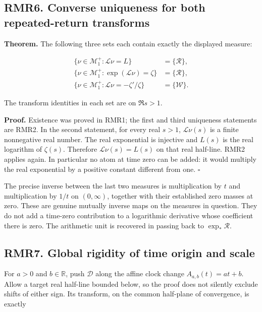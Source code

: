 \subsection{RMR6. Converse uniqueness for both repeated-return
transforms}\label{rmr6.-converse-uniqueness-for-both-repeated-return-transforms}

\textbf{Theorem.} The following three sets each contain exactly the
displayed measure:

\[
\begin{aligned}
\{\nu\in\mathscr M_1^+:\mathcal L\nu=L\}&=\{\mathcal R\},\\
\{\nu\in\mathscr M_1^+:\exp(\mathcal L\nu)=\zeta\}&=\{\mathcal R\},\\
\{\nu\in\mathscr M_1^+:\mathcal L\nu=-\zeta'/\zeta\}&=\{\mathcal W\}.
\end{aligned}
\tag{RMR6.1}
\]

The transform identities in each set are on \(\Re s>1\).

\textbf{Proof.} Existence was proved in RMR1; the first and third
uniqueness statements are RMR2. In the second statement, for every real
\(s>1\), \(\mathcal L\nu(s)\) is a finite nonnegative real number. The
real exponential is injective and \(L(s)\) is the real logarithm of
\(\zeta(s)\). Therefore \(\mathcal L\nu(s)=L(s)\) on that real
half-line. RMR2 applies again. In particular no atom at time zero can be
added: it would multiply the real exponential by a positive constant
different from one. \(\square\)

The precise inverse between the last two measures is multiplication by
\(t\) and multiplication by \(1/t\) on \((0,\infty)\), together with
their established zero masses at zero. These are genuine mutually
inverse maps on the measures in question. They do not add a time-zero
contribution to a logarithmic derivative whose coefficient there is
zero. The arithmetic unit is recovered in passing back to
\(\exp_*\mathcal R\).

\subsection{RMR7. Global rigidity of time origin and
scale}\label{rmr7.-global-rigidity-of-time-origin-and-scale}

For \(a>0\) and \(b\in\mathbb R\), push \(\mathcal D\) along the affine
clock change \(A_{a,b}(t)=at+b\). Allow a target real half-line bounded
below, so the proof does not silently exclude shifts of either sign. Its
transform, on the common half-plane of convergence, is exactly

